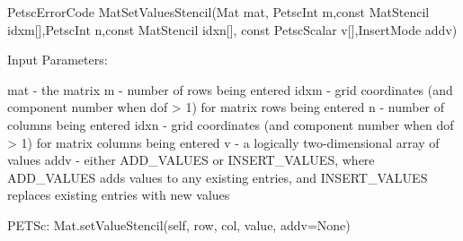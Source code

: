 PetscErrorCode MatSetValuesStencil(Mat mat,
    PetscInt m,const MatStencil idxm[],PetscInt n,const MatStencil idxn[],
    const PetscScalar v[],InsertMode addv)


Input Parameters:

mat - the matrix
m - number of rows being entered
idxm - grid coordinates (and component number when dof > 1) for matrix
    rows being entered
n - number of columns being entered
idxn - grid coordinates (and component number when dof > 1) for matrix
    columns being entered
v - a logically two-dimensional array of values
addv - either ADD_VALUES or INSERT_VALUES, where ADD_VALUES adds values
    to any existing entries, and INSERT_VALUES replaces existing entries
    with new values

PETSc:
Mat.setValueStencil(self, row, col, value, addv=None)
